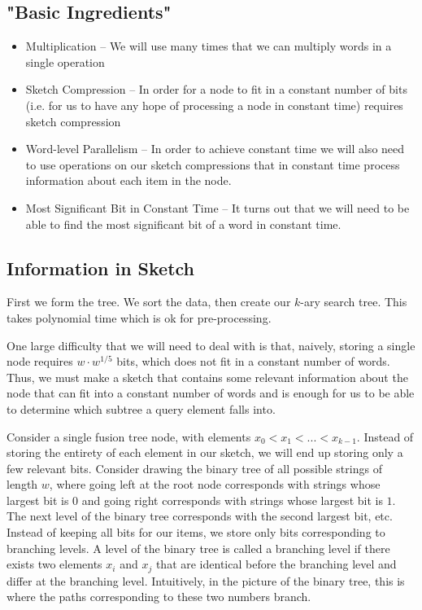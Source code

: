 \documentclass[11pt]{article}
\begin{document}
\subsection{"Basic Ingredients"}
\begin{itemize}
\item Multiplication -- We will use many times that we can multiply words in a single operation
\item Sketch Compression -- In order for a node to fit in a constant number of bits (i.e. for us to have any hope of processing a node in constant time) requires sketch compression
\item Word-level Parallelism -- In order to achieve constant time we will also need to use operations on our sketch compressions that in constant time process information about each item in the node.
\item Most Significant Bit in Constant Time -- It turns out that we will need to be able to find the most significant bit of a word in constant time.
\end{itemize}

\subsection{Information in Sketch}
First we form the tree. We sort the data, then create our $k$-ary search tree. This takes polynomial time which is ok for pre-processing.

One large difficulty that we will need to deal with is that, naively, storing a single node requires $w\cdot w^{1/5}$ bits, which does not fit in a constant number of words. Thus, we must make a sketch that contains some relevant information about the node that can fit into a constant number of words and is enough for us to be able to determine which subtree a query element falls into.

Consider a single fusion tree node, with elements $x_0 < x_1 < ... < x_{k-1}$. Instead of storing the entirety of each element in our sketch, we will end up storing only a few relevant bits. Consider drawing the binary tree of all possible strings of length $w$, where going left at the root node corresponds with strings whose largest bit is $0$ and going right corresponds with strings whose largest bit is $1$. The next level of the binary tree corresponds with the second largest bit, etc. Instead of keeping all bits for our items, we store only bits corresponding to branching levels. A level of the binary tree is called a branching level if there exists two elements $x_i$ and $x_j$ that are identical before the branching level and differ at the branching level. Intuitively, in the picture of the binary tree, this is where the paths corresponding to these two numbers branch.
\end{document}
